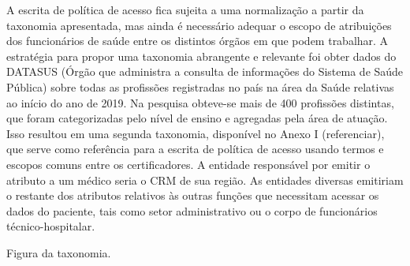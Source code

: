 \documentclass[a4paper,11pt]{article}
\begin{document}
A escrita de política de acesso fica sujeita a uma normalização a partir da taxonomia apresentada, mas ainda é necessário adequar o escopo de atribuições dos funcionários de saúde entre os distintos órgãos em que podem trabalhar. A estratégia para propor uma taxonomia abrangente e relevante foi obter dados do DATASUS (Órgão que administra a consulta de informações do Sistema de Saúde Pública) sobre todas as profissões registradas no país na área da Saúde relativas ao início do ano de 2019. Na pesquisa obteve-se mais de 400 profissões distintas, que foram categorizadas pelo nível de ensino e agregadas pela área de atuação. Isso resultou em uma segunda taxonomia, disponível no Anexo I {\color{RoyalBlue}(referenciar)}, que serve como referência para a escrita de política de acesso usando termos e escopos comuns entre os certificadores. A entidade responsável por emitir o atributo a um médico seria o CRM de sua região. As entidades diversas emitiriam o restante dos atributos relativos às outras funções que necessitam acessar os dados do paciente, tais como setor administrativo ou o corpo de funcionários técnico-hospitalar.

{\color{ForestGreen}Figura da taxonomia}.
\end{document}
